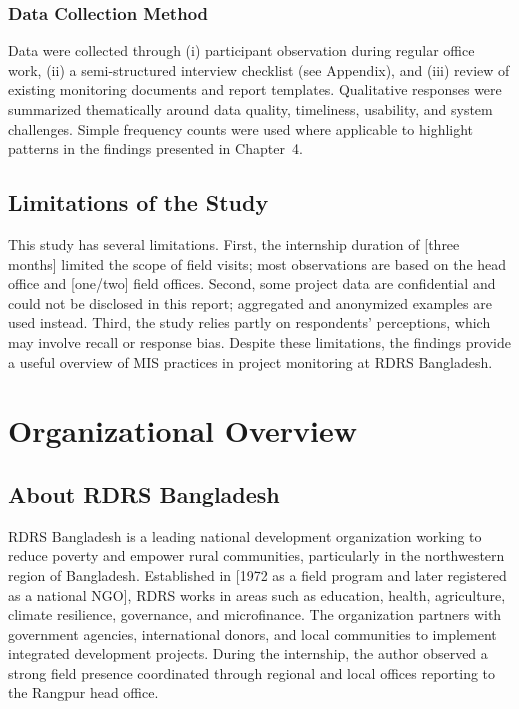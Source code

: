 \documentclass[12pt,a4paper]{report}
\begin{document}
\subsection{Data Collection Method}
Data were collected through (i) participant observation during regular
office work, (ii) a semi-structured interview checklist (see Appendix),
and (iii) review of existing monitoring documents and report templates.
Qualitative responses were summarized thematically around data quality,
timeliness, usability, and system challenges. Simple frequency counts
were used where applicable to highlight patterns in the findings
presented in Chapter~4.

\section{Limitations of the Study}
This study has several limitations. First, the internship duration of
[three months] limited the scope of field visits; most observations are
based on the head office and [one/two] field offices. Second, some
project data are confidential and could not be disclosed in this report;
aggregated and anonymized examples are used instead. Third, the study
relies partly on respondents' perceptions, which may involve recall or
response bias. Despite these limitations, the findings provide a useful
overview of MIS practices in project monitoring at RDRS Bangladesh.

\chapter{Organizational Overview}

\section{About RDRS Bangladesh}
RDRS Bangladesh is a leading national development organization working to
reduce poverty and empower rural communities, particularly in the
northwestern region of Bangladesh. Established in [1972 as a field
program and later registered as a national NGO], RDRS works in areas
such as education, health, agriculture, climate resilience, governance,
and microfinance. The organization partners with government agencies,
international donors, and local communities to implement integrated
development projects. During the internship, the author observed a strong
field presence coordinated through regional and local offices reporting
to the Rangpur head office.
\end{document}
